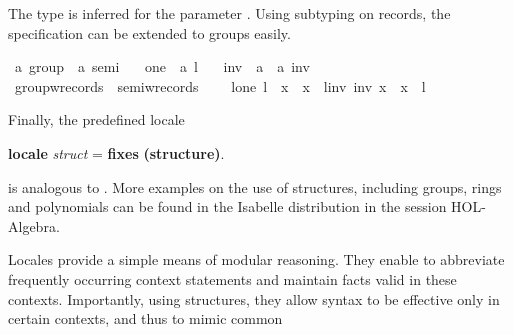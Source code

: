 \begin{isabellebody}
\begin{isamarkuptext}
The type  is inferred for the parameter .  Using subtyping on records, the specification can be extended
  to groups easily.%
\end{isamarkuptext}%
\isamarkupfalse%
\ {\isacharprime}a\ group\ {\isacharequal}\ {\isachardoublequote}{\isacharprime}a\ semi{\isachardoublequote}\ {\isacharplus}\isanewline
\ \ one\ {\isacharcolon}{\isacharcolon}\ {\isachardoublequote}{\isacharprime}a{\isachardoublequote}\ {\isacharparenleft}{\isachardoublequote}l{\isasymindex}{\isachardoublequote}\ {}{}{}{\isacharparenright}\isanewline
\ \ inv\ {\isacharcolon}{\isacharcolon}\ {\isachardoublequote}{\isacharprime}a\ {\isasymRightarrow}\ {\isacharprime}a{\isachardoublequote}\ {\isacharparenleft}{\isachardoublequote}inv{\isasymindex}\ {\isacharunderscore}{\isachardoublequote}\ {\isacharbrackleft}{}{}{\isacharbrackright}\ {}{}{\isacharparenright}\isanewline
\isamarkupfalse%
\ group{\isacharunderscore}w{\isacharunderscore}records\ {\isacharequal}\ semi{\isacharunderscore}w{\isacharunderscore}records\ {\isacharplus}\isanewline
\ \ \ l{\isacharunderscore}one{\isacharcolon}\ {\isachardoublequote}l\ {\isasymbullet}\ x\ {\isacharequal}\ x{\isachardoublequote}\ \ l{\isacharunderscore}inv{\isacharcolon}\ {\isachardoublequote}inv\ x\ {\isasymbullet}\ x\ {\isacharequal}\ l{\isachardoublequote}\isamarkuptrue%
%
\begin{isamarkuptext}%
Finally, the predefined locale
\begin{center}
  \textbf{locale} \textit{struct} = \textbf{fixes} 
    \textbf{(structure)}.
\end{center}
  is analogous to .  
  More examples on the use of structures, including groups, rings and
  polynomials can be found in the Isabelle distribution in the
  session HOL-Algebra.%
\end{isamarkuptext}%
\isamarkuptrue%
%
\isamarkuptrue%
%
\begin{isamarkuptext}%
Locales provide a simple means of modular reasoning.  They enable to
  abbreviate frequently occurring context statements and maintain facts
  valid in these contexts.  Importantly, using structures, they allow syntax to be
  effective only in certain contexts, and thus to mimic common

\end{isamarkuptext}
\end{isabellebody}
